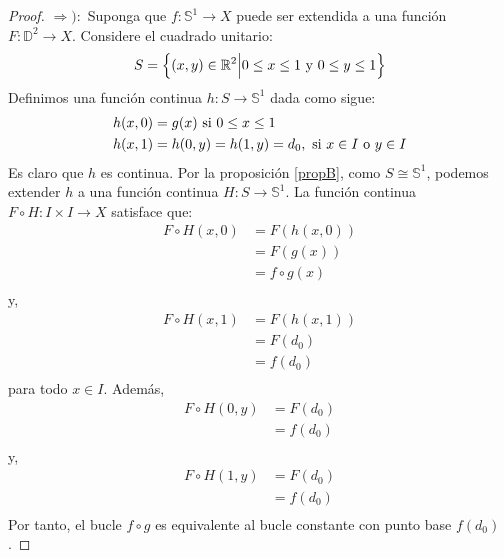 \documentclass[12pt]{report}
\theoremstyle{largebreak}
\newcommand\cf[3]{\ensuremath{#1:#2\rightarrow#3}}
\begin{document}
    \begin{proof}
        $\Rightarrow):$ Suponga que $\cf{f}{\mathbb{S}^1}{X}$ puede ser extendida a una función $\cf{F}{\mathbb{D}^2}{X}$. Considere el cuadrado unitario:
        \begin{equation*}
            S=\left\{ (x,y)\in\mathbb{R}^2\Big|0\leq x\leq 1\textup{ y }0\leq y\leq 1 \right\}
        \end{equation*}
        Definimos una función continua $\cf{h}{S}{\mathbb{S}^1}$ dada como sigue:
        \begin{equation*}
            \begin{split}
                h(x,0) &= g(x) \textup{ si } 0\leq x\leq 1\\
                h(x,1) &= h(0,y)=h(1,y)=d_0,\textup{ si }x\in I\textup{ o }y\in I \\
            \end{split}
        \end{equation*}
        Es claro que $h$ es continua. Por la proposición \ref{propB}, como $S\cong\mathbb{S}^1$, podemos extender $h$ a una función continua $\cf{H}{S}{\mathbb{S}^1}$. La función continua $\cf{F\circ H}{I\times I}{X}$ satisface que:
        \begin{equation*}
            \begin{split}
                F\circ H(x,0) &= F(h(x,0))\\
                &= F(g(x))\\
                &= f\circ g(x)\\
            \end{split}
        \end{equation*}
        y,
        \begin{equation*}
            \begin{split}
                F\circ H(x,1) &= F(h(x,1))\\
                &= F(d_0)\\
                &= f(d_0)\\
            \end{split}
        \end{equation*}
        para todo $x\in I$. Además,
        \begin{equation*}
            \begin{split}
                F\circ H(0,y) &= F(d_0) \\
                &= f(d_0)\\
            \end{split}
        \end{equation*}
        y,
        \begin{equation*}
            \begin{split}
                F\circ H(1,y) &= F(d_0) \\
                &= f(d_0)\\
            \end{split}
        \end{equation*}
        Por tanto, el bucle $f\circ g$ es equivalente al bucle constante con punto base $f(d_0)$.


\end{proof}
\end{document}
